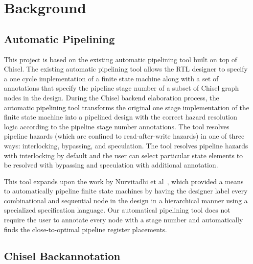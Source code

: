 \section{Background}
\subsection{Automatic Pipelining}
\label{sec:related-work}
This project is based on the existing automatic pipelining tool built on top of Chisel\cite{Bachrach:2012}. The existing automatic pipelining tool allows the RTL designer to specify a one cycle implementation of a finite state machine along with a set of annotations that specify the pipeline stage number of a subset of Chisel graph nodes in the design. During the Chisel backend elaboration process, the automatic pipelining tool transforms the original one stage implementation of the finite state machine into a pipelined design with the correct hazard resolution logic according to the pipeline stage number annotations. The tool resolves pipeline hazards (which are confined to read-after-write hazards) in one of three ways: interlocking, bypassing, and speculation. The tool resolves pipeline hazards with interlocking by default and the user can select particular state elements to be resolved with bypassing and speculation with additional annotation.

This tool expands upon the work by Nurvitadhi et al~\cite{hoe:syn}, which provided a means to automatically pipeline finite state machines by having the designer label every combinational and sequential node in the design in a hierarchical manner using a specialized specification language. Our automatical pipelining tool does not require the user to annotate every node with a stage number and automatically finds the close-to-optimal pipeline register placements.

\subsection{Chisel Backannotation}
